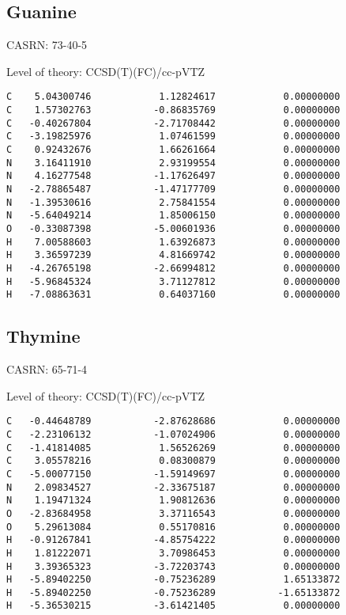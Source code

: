 \documentclass[journal=jctcce,manuscript=article,layout=traditional]{achemso}
\newcommand{\TZ}{cc-pVTZ}
\begin{document}
\subsection{Guanine}

CASRN: 73-40-5

\begin{singlespace}
\noindent Level of theory: CCSD(T)(FC)/{\TZ}
\begin{verbatim}
C    5.04300746            1.12824617            0.00000000
C    1.57302763           -0.86835769            0.00000000
C   -0.40267804           -2.71708442            0.00000000
C   -3.19825976            1.07461599            0.00000000
C    0.92432676            1.66261664            0.00000000
N    3.16411910            2.93199554            0.00000000
N    4.16277548           -1.17626497            0.00000000
N   -2.78865487           -1.47177709            0.00000000
N   -1.39530616            2.75841554            0.00000000
N   -5.64049214            1.85006150            0.00000000
O   -0.33087398           -5.00601936            0.00000000
H    7.00588603            1.63926873            0.00000000
H    3.36597239            4.81669742            0.00000000
H   -4.26765198           -2.66994812            0.00000000
H   -5.96845324            3.71127812            0.00000000
H   -7.08863631            0.64037160            0.00000000
\end{verbatim}
\end{singlespace}

\subsection{Thymine}

CASRN:  65-71-4

\begin{singlespace}
\noindent Level of theory: CCSD(T)(FC)/{\TZ}
\begin{verbatim}
C   -0.44648789           -2.87628686            0.00000000
C   -2.23106132           -1.07024906            0.00000000
C   -1.41814085            1.56526269            0.00000000
C    3.05578216            0.08300879            0.00000000
C   -5.00077150           -1.59149697            0.00000000
N    2.09834527           -2.33675187            0.00000000
N    1.19471324            1.90812636            0.00000000
O   -2.83684958            3.37116543            0.00000000
O    5.29613084            0.55170816            0.00000000
H   -0.91267841           -4.85754222            0.00000000
H    1.81222071            3.70986453            0.00000000
H    3.39365323           -3.72203743            0.00000000
H   -5.89402250           -0.75236289            1.65133872
H   -5.89402250           -0.75236289           -1.65133872
H   -5.36530215           -3.61421405            0.00000000
\end{verbatim}
\end{singlespace}
\end{document}
